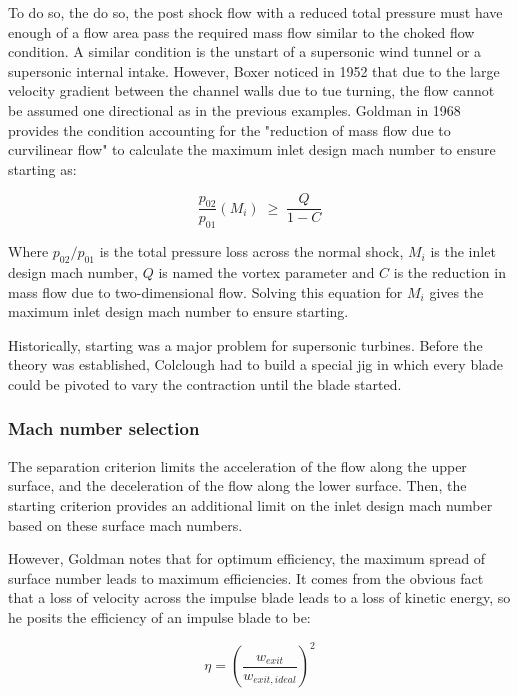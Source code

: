 To do so, the do so, the post shock flow with a reduced total pressure must have enough of a flow area pass the required mass flow similar to the choked flow condition. A similar condition is the unstart of a supersonic wind tunnel or a supersonic internal intake. However, Boxer noticed in 1952 that due to the large velocity gradient between the channel walls due to tue turning, the flow cannot be assumed one directional as in the previous examples. Goldman in 1968 provides the condition accounting for the "reduction of mass flow due to curvilinear flow" to calculate the maximum inlet design mach number to ensure starting as:

\begin{equation}
\frac{p_{02}}{p_{01}}(M_i) \;\geq\; \frac{Q}{1-C}
\end{equation}

Where $p_{02}/p_{01}$ is the total pressure loss across the normal shock, $M_i$ is the inlet design mach number, $Q$ is named the vortex parameter \cite{sudhof} and $C$ is the reduction in mass flow due to two-dimensional flow. Solving this equation for $M_i$ gives the maximum inlet design mach number to ensure starting. 

Historically, starting was a major problem for supersonic turbines. Before the theory was established, Colclough had to build a special jig in which every blade could be pivoted to vary the contraction until the blade started.

\subsubsection{Mach number selection}

The separation criterion limits the acceleration of the flow along the upper surface, and the deceleration of the flow along the lower surface. Then, the starting criterion provides an additional limit on the inlet design mach number based on these surface mach numbers. 

However, Goldman notes that for optimum efficiency, the maximum spread of surface number leads to maximum efficiencies. It comes from the obvious fact that a loss of velocity across the impulse blade leads to a loss of kinetic energy, so he posits the efficiency of an impulse blade to be:

\begin{equation}
    \eta = \left(\frac{w_{exit}}{w_{exit,ideal}}\right)^2
\end{equation}



